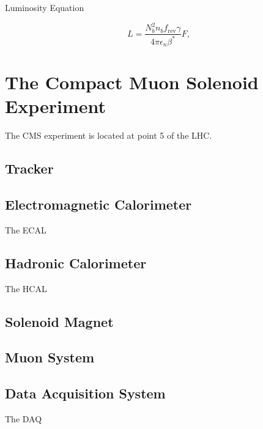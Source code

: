 Luminosity Equation

\begin{equation}
L=\frac{N_{b}^{2}n_{b}f_{\text{rev}}\gamma}{4\pi\epsilon_{n}\beta^{*}}F,
\end{equation}

\section{The Compact Muon Solenoid Experiment}
\label{SECTION:ExperimentalApparatus_CMS}

The \gls{CMS} experiment is located at point 5 of the \gls{LHC}.





\subsection{Tracker}
\label{SUBSECTION:ExperimentalApparatus_CMS_Tracker}

\subsection{Electromagnetic Calorimeter}
\label{SUBSECTION:ExperimentalApparatus_CMS_ECAL}

The \gls{ECAL} 


\subsection{Hadronic Calorimeter}
\label{SUBSECTION:ExperimentalApparatus_CMS_HCAL}

The \gls{HCAL}

\subsection{Solenoid Magnet}
\label{SUBSECTION:ExperimentalApparatus_CMS_Magnet}

\subsection{Muon System}
\label{SUBSECTION:ExperimentalApparatus_CMS_Mouns}

\subsection{Data Acquisition System}
\label{SUBSECTION:ExperimentalApparatus_CMS_DAQ}

The \gls{DAQ}

